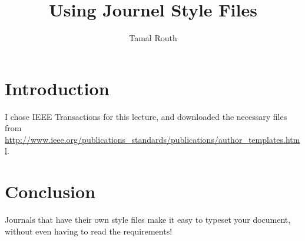 \documentclass{article}
\title{Using Journel Style Files}
\author{Tamal Routh}
\begin{document}
\maketitle

\section{Introduction}

I chose IEEE Transactions for this lecture, and downloaded the necessary files from \url{http://www.ieee.org/publications_standards/publications/author_templates.html}.

\section{Conclusion}

Journals that have their own style files make it easy to typeset your document, without even having to read the requirements!
\end{document}
